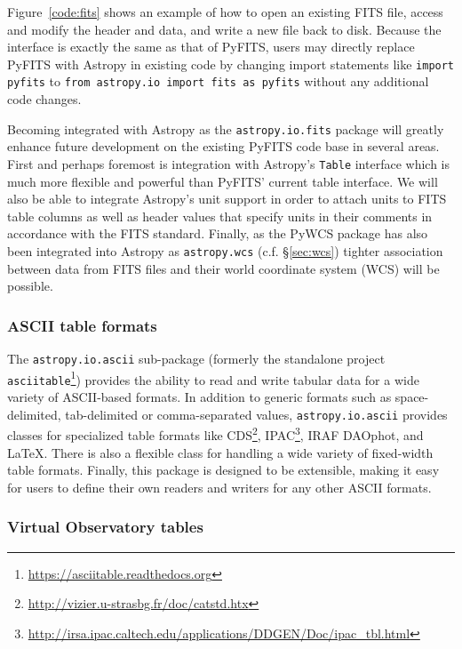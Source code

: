 \documentclass[traditabstract]{aa}
\begin{document}
Figure~\ref{code:fits} shows an example of how to open an existing FITS file,
access and modify the header and data, and write a new file back to disk.
Because the interface is exactly the same as that of PyFITS, users may directly
replace PyFITS with Astropy in existing code by changing import statements like
\texttt{import pyfits} to \texttt{from astropy.io import fits as pyfits}
without any additional code changes.

Becoming integrated with Astropy as the \texttt{astropy.io.fits} package will
greatly enhance future development on the existing PyFITS code base in several
areas. First and perhaps foremost is integration with Astropy's \texttt{Table}
interface which is much more flexible and powerful than PyFITS' current table
interface. We will also be able to integrate Astropy's unit support in order to
attach units to FITS table columns as well as header values that specify units
in their comments in accordance with the FITS standard. Finally, as the PyWCS
package has also been integrated into Astropy as \texttt{astropy.wcs} (c.f.
\S\ref{sec:wcs}) tighter association between data from FITS files and their
world coordinate system (WCS) will be possible.

\subsubsection{ASCII table formats}

\label{sec:ascii}


The \texttt{astropy.io.ascii} sub-package (formerly the standalone project
\texttt{asciitable}\footnote{\url{https://asciitable.readthedocs.org}})
provides the ability to read and write tabular data for a wide variety of
ASCII-based formats. In addition to generic formats such as space-delimited,
tab-delimited or comma-separated values, \texttt{astropy.io.ascii} provides
classes for specialized table formats like
CDS\footnote{\url{http://vizier.u-strasbg.fr/doc/catstd.htx}},
IPAC\footnote{\url{http://irsa.ipac.caltech.edu/applications/DDGEN/Doc/ipac_tbl.html}},
IRAF DAOphot, and LaTeX. There is also a flexible class for handling a wide
variety of fixed-width table formats. Finally, this package is designed to be
extensible, making it easy for users to define their own readers and writers for
any other ASCII formats.

\subsubsection{Virtual Observatory tables}
\end{document}
